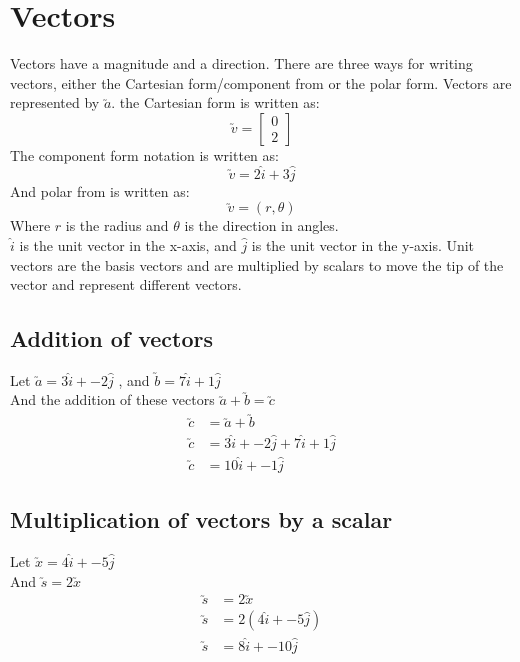 \documentclass[a4paper,10pt]{report}
\begin{document}
\section{Vectors}
Vectors have a magnitude and a direction.  There are three ways for writing vectors, either the Cartesian form/component from or the polar form.  Vectors are represented by $\utilde{a}$.  the Cartesian form is written as:
$$
	\utilde{v} = \begin{bmatrix}
		0 \\
		2
	\end{bmatrix}
$$
The component form notation is written as:
$$
	\utilde{v} = 2\hat{i} + 3\hat{j}
$$
And polar from is written as:
$$
	\utilde{v} = (r, \theta)
$$
Where $r$ is the radius and $\theta$ is the direction in angles.\\

$\hat{i}$ is the unit vector in the x-axis, and $\hat{j}$ is the unit vector in the y-axis.  Unit vectors are the basis vectors and are multiplied by scalars to move the tip of the vector and represent different vectors.

\subsection{Addition of vectors}
Let $\utilde{a} = 3\hat{i} + -2\hat{j}$ , and $\utilde{b} = 7\hat{i} + 1\hat{j}$\\
And the addition of these vectors $\utilde{a} + \utilde{b} = \utilde{c}$\\
\begin{align*}
	\utilde{c} & = \utilde{a} + \utilde{b}                    \\
	\utilde{c} & = 3\hat{i} + -2\hat{j} + 7\hat{i} + 1\hat{j} \\
	\utilde{c} & = 10\hat{i} + -1\hat{j}
\end{align*}

\subsection{Multiplication of vectors by a scalar}
Let $\utilde{x} = 4\hat{i} + -5\hat{j}$\\
And $\utilde{s} = 2\utilde{x}$
\begin{align*}
	\utilde{s} & = 2\utilde{x}             \\
	\utilde{s} & = 2(4\hat{i} + -5\hat{j}) \\
	\utilde{s} & = 8\hat{i} + -10\hat{j}
\end{align*}
\end{document}

